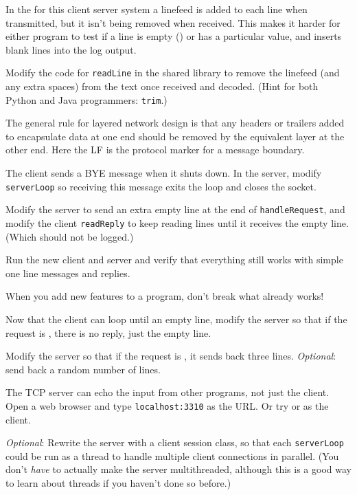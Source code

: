 
\STEP
In the  for this client server system a linefeed is added to
each line when transmitted, but it isn't being removed when received. This
makes it harder for either program to test if a line is  empty (\DQ{}) or
has a particular value, and inserts blank lines into the log output.

Modify the code for \texttt{readLine} in the shared library to remove the
linefeed (and any extra spaces) from the text once received and decoded.
(Hint for both Python and Java programmers: \texttt{trim}.)

\begin{IMPORTANT}
The general rule for layered network design is that any headers or trailers
added to encapsulate data at one end should be removed by the equivalent
layer at the other end. Here the LF is the protocol marker for a message
boundary.
\end{IMPORTANT}

\STEP
The client sends a BYE message when it shuts down. In the server, modify
\texttt{serverLoop}
so receiving this message exits the loop and closes the socket.

\STEP
Modify the server to send an extra empty line at the end of \texttt{handleRequest},
and modify the client \texttt{readReply} to keep reading lines until it receives
the empty line. (Which should not be logged.)

Run the new client and server and verify that everything still works with
simple one line messages and replies.

\begin{IMPORTANT}
When you add new features to a program, don't break what already works!
\end{IMPORTANT}

\STEP
Now that the client can loop until an empty line, modify the server so
that if the request is , there is no reply, just the empty line.

\STEP
Modify the server so that if the request is , it sends back three
lines. \emph{Optional}: send back a random number of lines.



The TCP server can echo the input from other programs, not just the client.
Open a web browser and type \texttt{localhost:3310} as the URL.
Or try  or  as the client. 

\emph{Optional}: Rewrite the server with a client session class, so that
each \texttt{serverLoop}
could be run as a thread to handle multiple client connections in parallel.
(You don't \emph{have} to actually make the server multithreaded, although
this is a good way to learn about threads if you haven't done so before.)


\COPYRIGHT


